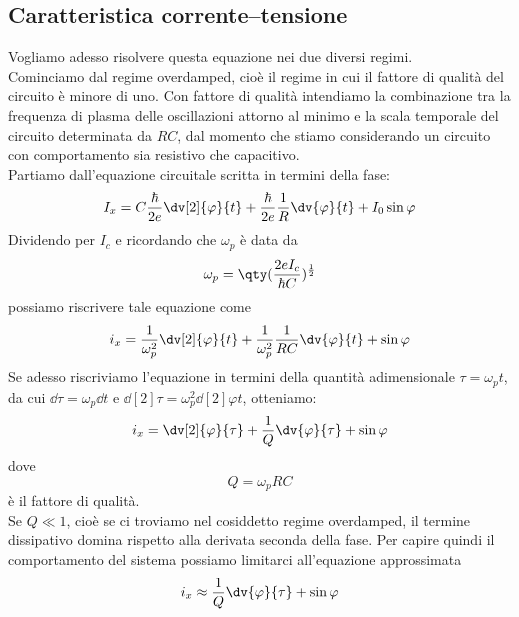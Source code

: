 \subsection{Caratteristica corrente--tensione}
Vogliamo adesso risolvere questa equazione nei due diversi regimi.\\
Cominciamo dal regime overdamped, cioè il regime in cui il fattore di qualità del circuito è minore di uno. Con fattore di qualità intendiamo la combinazione tra la frequenza di plasma delle oscillazioni attorno al minimo e la scala temporale del circuito determinata da $RC$, dal momento che stiamo considerando un circuito con comportamento sia resistivo che capacitivo.\\
Partiamo dall'equazione circuitale scritta in termini della fase:
\begin{equation*}
    I_x = C \frac{\hbar}{2e} \dv[2]{\varphi}{t} + \frac{\hbar}{2e} \frac{1}{R} \dv{\varphi}{t} + I_0 \sin{\varphi}
\end{equation*}
Dividendo per $I_c$ e ricordando che $\omega_p$ è data da
\begin{equation*}
    \omega_p=\qty(\frac{2eI_c}{\hbar C})^{\frac{1}{2}}
\end{equation*}
possiamo riscrivere tale equazione come
\begin{equation*}
    i_x = \frac{1}{\omega_p^2} \dv[2]{\varphi}{t} + \frac{1}{\omega^2_p} \frac{1}{R C} \dv{\varphi}{t} + \sin{\varphi}
\end{equation*}
Se adesso riscriviamo l'equazione in termini della quantità adimensionale $\tau=\omega_p t$, da cui $\dd{\tau}=\omega_p \dd{t}$ e $\dd[2]{\tau}=\omega_p^2 \dd[2]{\varphi}{t}$, otteniamo:
\begin{equation*}
    i_x = \dv[2]{\varphi}{\tau} + \frac{1}{Q} \dv{\varphi}{\tau} + \sin{\varphi}
\end{equation*}
dove
\begin{equation*}
    Q=\omega_p RC
\end{equation*}
è il fattore di qualità.\\
Se $Q \ll 1$, cioè se ci troviamo nel cosiddetto regime overdamped, il termine dissipativo domina rispetto alla derivata seconda della fase. Per capire quindi il comportamento del sistema possiamo limitarci all'equazione approssimata
\begin{equation*}
    i_x \approx \frac{1}{Q} \dv{\varphi}{\tau} + \sin{\varphi}
\end{equation*}
